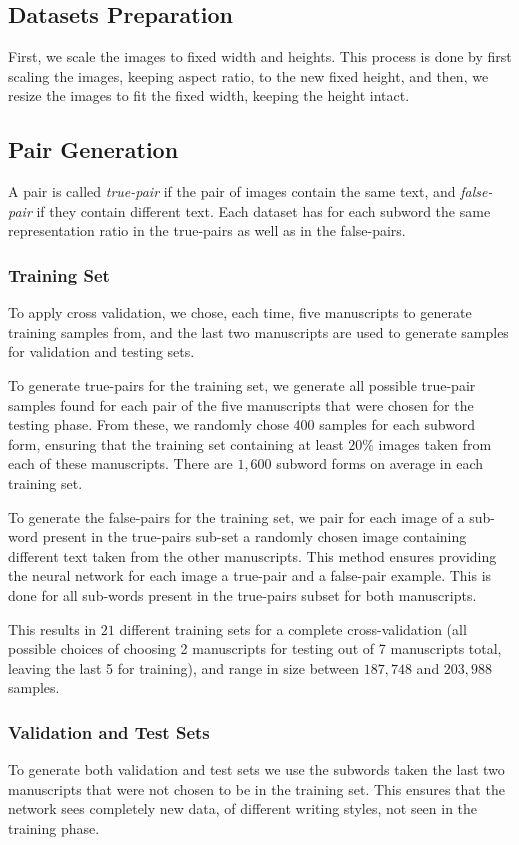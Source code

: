 \documentclass[10pt, a4paper, conference, compsocconf]{IEEEtran}
\begin{document}
\subsection{Datasets Preparation}
First, we scale the images to fixed width and heights. This process is done by first scaling the images, keeping aspect ratio, to the new fixed height, and then, we resize the images to fit the fixed width, keeping the height intact.

\subsection{Pair Generation}
A pair is called {\em true-pair} if the pair of images contain the same text, and {\em false-pair} if they contain different text. Each dataset has for each subword the same representation ratio in the true-pairs as well as in the false-pairs.

\subsubsection{Training Set}
To apply cross validation, we chose, each time, five manuscripts to generate training samples from, and the last two manuscripts are used to generate samples for validation and testing sets.

To generate true-pairs for the training set, we generate all possible true-pair samples found for each pair of the five manuscripts that were chosen for the testing phase. From these, we randomly chose $400$ samples for each subword form, ensuring that the training set containing at least $20\%$ images taken from each of these manuscripts. There are $1,600$ subword forms on average in each training set.

To generate the false-pairs for the training set, we pair for each image of a sub-word present in the true-pairs sub-set a randomly chosen image containing different text taken from the other manuscripts. This method ensures providing the neural network for each image a true-pair and a false-pair example. This is done for all sub-words present in the true-pairs subset for both manuscripts.

This results in $21$ different training sets for a complete cross-validation (all possible choices of choosing 2 manuscripts for testing out of 7 manuscripts total, leaving the last 5 for training), and range in size between $187,748$ and $203,988$ samples.

\subsubsection{Validation and Test Sets}
To generate both validation and test sets we use the subwords taken the last two manuscripts that were not chosen to be in the training set. This ensures that the network sees completely new data, of different writing styles, not seen in the training phase.
\end{document}
